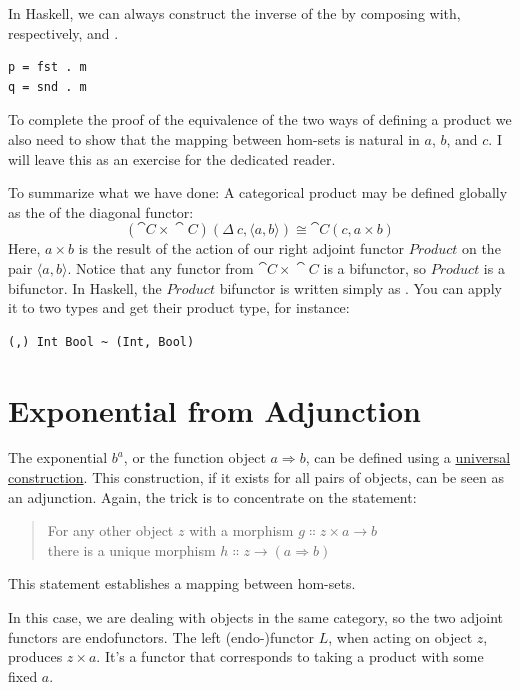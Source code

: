 In Haskell, we can always construct the inverse of the
 by composing  with, respectively,
 and .

\begin{Verbatim}
p = fst . m
q = snd . m
\end{Verbatim}
To complete the proof of the equivalence of the two ways of defining a
product we also need to show that the mapping between hom-sets is
natural in $a$, $b$, and $c$. I will leave this as
an exercise for the dedicated reader.

To summarize what we have done: A categorical product may be defined
globally as the  of the diagonal functor:
\[(\cat{C}\times{}\cat{C})(\Delta\ c, \langle a, b \rangle) \cong \cat{C}(c, a\times{}b)\]
Here, $a\times{}b$ is the result of the action of our right adjoint
functor $Product$ on the pair
$\langle a, b \rangle$. Notice that any functor from
$\cat{C}\times{}\cat{C}$ is a bifunctor, so $Product$ is a bifunctor. In
Haskell, the $Product$ bifunctor is written simply as
\code{(,)}. You can apply it to two types and get their product type,
for instance:

\begin{Verbatim}
(,) Int Bool ~ (Int, Bool)
\end{Verbatim}

\section{Exponential from Adjunction}

The exponential $b^a$, or the function object $a \Rightarrow b$, can be
defined using a \hyperref[function-types]{universal
construction}. This construction, if it exists for all pairs of objects,
can be seen as an adjunction. Again, the trick is to concentrate on the
statement:

\begin{quote}
For any other object $z$ with a morphism $g \Colon z\times{}a \to b$ \\
there is a unique morphism $h \Colon z \to (a \Rightarrow b)$
\end{quote}
This statement establishes a mapping between hom-sets.

In this case, we are dealing with objects in the same category, so the
two adjoint functors are endofunctors. The left (endo-)functor
$L$, when acting on object $z$, produces $z\times{}a$.
It's a functor that corresponds to taking a product with some fixed
$a$.

